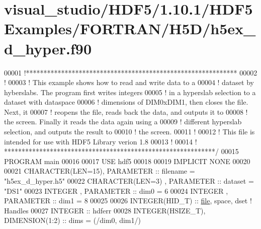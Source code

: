 \hypertarget{visual__studio_2_h_d_f5_21_810_81_2_h_d_f5_examples_2_f_o_r_t_r_a_n_2_h5_d_2h5ex__d__hyper_8f90_source}{}\section{visual\+\_\+studio/\+H\+D\+F5/1.10.1/\+H\+D\+F5\+Examples/\+F\+O\+R\+T\+R\+A\+N/\+H5\+D/h5ex\+\_\+d\+\_\+hyper.f90}
\label{visual__studio_2_h_d_f5_21_810_81_2_h_d_f5_examples_2_f_o_r_t_r_a_n_2_h5_d_2h5ex__d__hyper_8f90_source}

\begin{DoxyCode}
00001 \textcolor{comment}{!************************************************************}
00002 \textcolor{comment}{!}
00003 \textcolor{comment}{!  This example shows how to read and write data to a}
00004 \textcolor{comment}{!  dataset by hyberslabs.  The program first writes integers}
00005 \textcolor{comment}{!  in a hyperslab selection to a dataset with dataspace}
00006 \textcolor{comment}{!  dimensions of DIM0xDIM1, then closes the file.  Next, it}
00007 \textcolor{comment}{!  reopens the file, reads back the data, and outputs it to}
00008 \textcolor{comment}{!  the screen.  Finally it reads the data again using a}
00009 \textcolor{comment}{!  different hyperslab selection, and outputs the result to}
00010 \textcolor{comment}{!  the screen.}
00011 \textcolor{comment}{!}
00012 \textcolor{comment}{!  This file is intended for use with HDF5 Library verion 1.8}
00013 \textcolor{comment}{!}
00014 \textcolor{comment}{! ************************************************************/}
00015 \textcolor{keyword}{PROGRAM} main
00016 
00017   \textcolor{keywordtype}{USE }hdf5
00018 
00019   \textcolor{keywordtype}{IMPLICIT NONE}
00020 
00021   \textcolor{keywordtype}{CHARACTER(LEN=15)}, \textcolor{keywordtype}{PARAMETER} :: filename = \textcolor{stringliteral}{"h5ex\_d\_hyper.h5"}
00022   \textcolor{keywordtype}{CHARACTER(LEN=3)} , \textcolor{keywordtype}{PARAMETER} :: dataset  = \textcolor{stringliteral}{"DS1"}
00023   \textcolor{keywordtype}{INTEGER}          , \textcolor{keywordtype}{PARAMETER} :: dim0     = 6
00024   \textcolor{keywordtype}{INTEGER}          , \textcolor{keywordtype}{PARAMETER} :: dim1     = 8
00025 
00026   \textcolor{keywordtype}{INTEGER(HID\_T)}  :: \hyperlink{structfile}{file}, space, dset \textcolor{comment}{! Handles}
00027   \textcolor{keywordtype}{INTEGER}         :: hdferr
00028   \textcolor{keywordtype}{INTEGER(HSIZE\_T)}, \textcolor{keywordtype}{DIMENSION(1:2)} :: dims = (/dim0, dim1/)

\end{DoxyCode}

